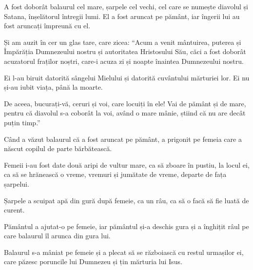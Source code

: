 {A fost doborât balaurul cel mare, șarpele cel vechi, cel care se numește diavolul și Satana, înșelătorul întregii lumi. El a fost aruncat pe pământ, iar îngerii lui au fost aruncați împreună cu el.


\par }{\PP {}Și am auzit în cer un glas tare, care zicea: “Acum a venit mântuirea, puterea și Împărăția Dumnezeului nostru și autoritatea Hristosului Său, căci a fost doborât acuzatorul fraților noștri, care-i acuza zi și noapte înaintea Dumnezeului nostru.

Ei l-au biruit datorită sângelui Mielului și datorită cuvântului mărturiei lor. Ei nu și-au iubit viața, până la moarte.

De aceea, bucurați-vă, ceruri și voi, care locuiți în ele! Vai de pământ și de mare, pentru că diavolul s-a coborât la voi, având o mare mânie, știind că nu are decât puțin timp.”


\par }{\PP {}Când a văzut balaurul că a fost aruncat pe pământ, a prigonit pe femeia care a născut copilul de parte bărbătească.

Femeii i-au fost date două aripi de vultur mare, ca să zboare în pustiu, la locul ei, ca să se hrănească o vreme, vremuri și jumătate de vreme, departe de fața șarpelui.

Șarpele a scuipat apă din gură după femeie, ca un râu, ca să o facă să fie luată de curent.

Pământul a ajutat-o pe femeie, iar pământul și-a deschis gura și a înghițit râul pe care balaurul îl arunca din gura lui.

Balaurul s-a mâniat pe femeie și a plecat să se războiască cu restul urmașilor ei,
care păzesc poruncile lui Dumnezeu și țin mărturia lui Isus.



\par }

